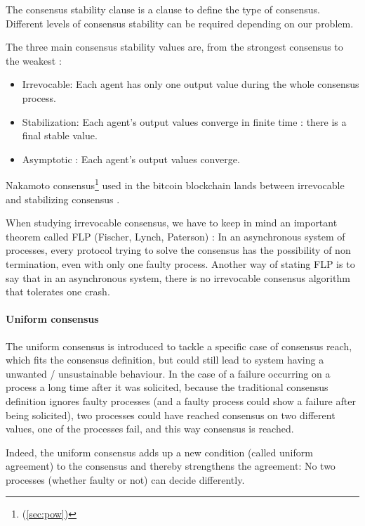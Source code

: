 \documentclass[11pt, twocolumn]{article}
\begin{document}
The consensus stability clause is a clause to define the type of consensus. Different levels of consensus stability can be required depending on our problem.

The three main consensus stability values are, from the strongest consensus to the weakest :

\begin{itemize}
    \item Irrevocable: Each agent has only one output value during the whole consensus process.
    \item Stabilization: Each agent's output values converge in finite time : there is a final stable value.
    \item Asymptotic : Each agent's output values converge.
\end{itemize}

Nakamoto consensus\footnote{ (\ref{sec:pow})} used in the bitcoin blockchain lands between irrevocable and stabilizing consensus \cite{proconsensus}.

When studying irrevocable consensus, we have to keep in mind an important theorem called FLP (Fischer, Lynch, Paterson) \cite{fischerlp}:
In an asynchronous system of processes, every protocol trying to solve the consensus has the possibility of non termination, even with only one faulty process.
Another way of stating FLP is to say that in an asynchronous system, there is no irrevocable consensus algorithm that tolerates one crash.

\paragraph{Uniform consensus}

The uniform consensus is introduced \cite{uniformConsensus} to tackle a specific case of consensus reach, which fits the consensus definition, but could still lead to system having a unwanted / unsustainable behaviour.
In the case of a failure occurring on a process a long time after it was solicited, because the traditional consensus definition ignores faulty processes (and a faulty process could show a failure after being solicited), two processes could have reached consensus on two different values, one of the processes fail, and this way consensus is reached.

Indeed, the uniform consensus adds up a new condition (called uniform agreement) to the consensus and thereby strengthens the agreement:
No two processes (whether faulty or not) can decide differently.
\end{document}
